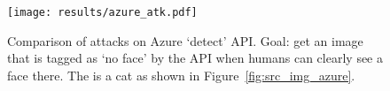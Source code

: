 \begin{figure}[t]
    \centering
    \texttt{[image: results/azure\_atk.pdf]}
    \caption{Comparison of attacks on Azure `detect' API. Goal: get an image that is tagged as `no face' by the API when humans can clearly see a face there. The \sourceimage is a cat as shown in Figure~\ref{fig:src_img_azure}.}
    \label{fig:azure_atk}
    \vspace{-0.3cm}
\end{figure}

